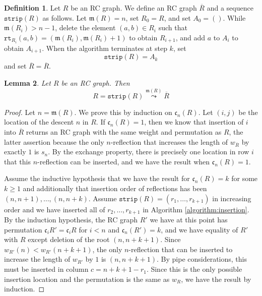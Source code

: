 \documentclass{amsart}
\newtheorem{lemma}{Lemma}[subsection]
\theoremstyle{definition}
\newtheorem{definition}[lemma]{Definition}
\theoremstyle{remark}
\numberwithin{equation}{subsection}
\newcommand{\wof}[1]{w_{#1}}
\newcommand{\rtt}{\mathtt{rt}}
\newcommand{\code}{\mathfrak{c}}
\newcommand{\maxd}{\mathfrak{m}}
\newcommand{\xleadsto}[2][]{\overset{#2}{\leadsto}}
\newcommand{\ins}[2]{{#2\xleadsto{#1}}}
\begin{document}
\begin{definition}
Let $R$ be an RC graph. We define an RC graph $\overline{R}$ and a sequence $\mathtt{strip}(R)$ as follows. Let $\maxd(R)=n$, set $R_0=R$, and set $A_0=()$. While $\maxd(R_i)> n -1$, delete the element $(a,b)\in R_i$ such that $\rtt_{R_i}(a,b)=(\maxd(R_i), \maxd(R_i) + 1)$ to obtain $R_{i+1}$, and add $a$ to $A_i$ to obtain $A_{i+1}$. When the algorithm terminates at step $k$, set
$$\mathtt{strip}(R) = A_k$$
and set $\overline{R} = \overline{R}$.
\end{definition}

\begin{lemma} \label{lemma:reconstruct}
Let $R$ be an RC graph. Then
$$R = \ins{\maxd(R)}{\mathtt{strip}(R)} \overline{R}$$
\end{lemma}
\begin{proof}
Let $n=\maxd(R)$. We prove this by induction on $\code_n(R)$. Let $(i,j)$ be the location of the descent $n$ in $R$. If $\code_n(R)=1$, then we know that insertion of $i$ into $\overline{R}$ returns an RC graph with the same weight and permutation as $R$, the latter assertion because the only $n$-reflection that increases the length of $\wof{\overline{R}}$ by exactly $1$ is $s_n$. By the exchange property, there is precisely one location in row $i$ that this $n$-reflection can be inserted, and we have the result when $\code_{n}(R)=1$.

Assume the inductive hypothesis that we have the result for $\code_n(R) = k$ for some $k\geq 1$ and additionally that insertion order of reflections has been $(n, n+1),\ldots,(n,n+k)$. Assume $\mathtt{strip}(R) = (r_1,\ldots,r_{k+1})$ in increasing order and we have inserted all of $r_2,\ldots,r_{k+1}$ in Algorithm \ref{algorithm:insertion}. By the induction hypothesis, the RC graph $R'$ we have at this point has permutation $\code_i{R'} = \code_i{R}$ for $i<n$ and $\code_n(R') = k$, and we have equality of $R'$ with $R$ except deletion of the root $(n, n+k + 1)$. Since $\wof{R'}(n) < \wof{R'}(n+k+1)$, the only $n$-reflection that can be inserted to increase the length of $\wof{R'}$ by $1$ is $(n, n+k+1)$. By pipe considerations, this must be inserted in column $c = n + k + 1 - r_1$. Since this is the only possible insertion location and the permutation is the same as $\wof{R}$, we have the result by induction.
\end{proof}
\end{document}
